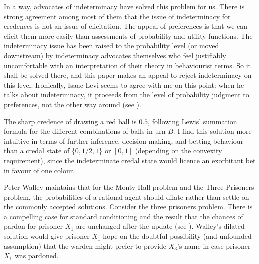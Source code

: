 In a way, advocates of indeterminacy have solved this
problem for us. There is strong agreement among most of
them that the issue of indeterminacy for credences is
not an issue of elicitation. The appeal of preferences
is that we can elicit them more easily than assessments
of probability and utility functions. The indeterminacy
issue has been raised to the probability level (or
moved downstream) by indeterminacy advocates themselves
who feel justifiably uncomfortable with an
interpretation of their theory in behaviourist terms.
So it shall be solved there, and this paper makes an
appeal to reject indeterminacy on this level.
Ironically, Isaac Levi seems to agree with me on this
point: when he talks about indeterminacy, it proceeds
from the level of probability judgment to preferences,
not the other way around (see ).


The sharp credence of drawing a red ball is $0.5$,
following Lewis' summation formula for the different
combinations of balls in urn $B$. I find this solution
more intuitive in terms of further inference, decision
making, and betting behaviour than a credal state of
$\{0,1/2,1\}$ or $[0,1]$ (depending on the convexity
requirement), since the indeterminate credal state
would licence an exorbitant bet in favour of one
colour.


Peter Walley maintains that for the Monty Hall problem
and the Three Prisoners problem, the probabilities of a
rational agent should dilate rather than settle on the
commonly accepted solutions. Consider the three
prisoners problem. There is a compelling case for
standard conditioning and the result that the chances
of pardon for prisoner $X_{1}$ are unchanged after the
update (see ). Walley's
dilated solution would give prisoner $X_{1}$ hope on
the doubtful possibility (and unfounded assumption)
that the warden might prefer to provide $X_{3}$'s name
in case prisoner $X_{1}$ was pardoned.

